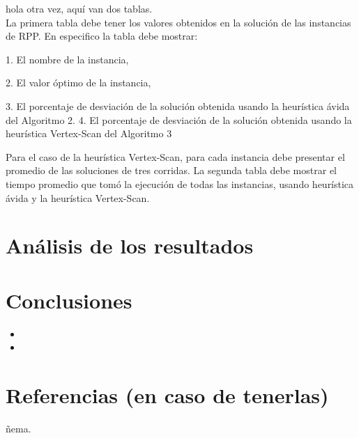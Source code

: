 \documentclass[11pt]{article}
\begin{document}
hola otra vez, aquí van dos tablas. \\

La primera tabla debe tener los valores obtenidos en la solución de las instancias de
RPP. En especifico la tabla debe mostrar:

1. El nombre de la instancia,

2. El valor óptimo de la instancia,

3. El porcentaje de desviación de la solución obtenida usando la heurística ávida del
Algoritmo 2.
4. El porcentaje de desviación de la solución obtenida usando la heurística Vertex-Scan
del Algoritmo 3

Para el caso de la heurística Vertex-Scan, para cada instancia debe presentar el promedio
de las soluciones de tres corridas.
La segunda tabla debe mostrar el tiempo promedio que tomó la ejecución de todas las
instancias, usando heurística ávida y la heurística Vertex-Scan.
\section{Análisis de los resultados}


\section{Conclusiones}

\begin{itemize}
   \item 
   \item 
\end{itemize}

\section{Referencias (en caso de tenerlas)}

ñema. \\
\end{document}
